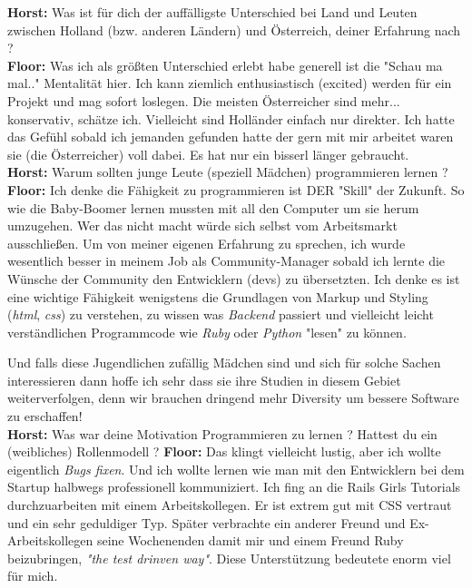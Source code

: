 \textbf{Horst:} Was ist für dich der auffälligste Unterschied bei Land und Leuten zwischen Holland (bzw. anderen Ländern) und Österreich, deiner Erfahrung nach ? \\
\textbf{Floor:} Was ich als größten Unterschied erlebt habe generell ist die "Schau ma mal.." Mentalität hier. Ich kann ziemlich enthusiastisch (excited) werden für ein Projekt und mag sofort loslegen. Die meisten Österreicher sind mehr... konservativ, schätze ich. Vielleicht sind Holländer einfach nur direkter. Ich hatte das Gefühl sobald ich jemanden gefunden hatte der gern mit mir arbeitet waren sie (die Österreicher) voll dabei. Es hat nur ein bisserl länger gebraucht. \\
\textbf{Horst:} Warum sollten junge Leute (speziell Mädchen) programmieren lernen ? \\
\textbf{Floor:} Ich denke die Fähigkeit zu programmieren ist DER "Skill" der Zukunft. So wie die Baby-Boomer lernen mussten mit all den Computer um sie herum umzugehen. Wer das nicht macht würde sich selbst vom Arbeitsmarkt ausschließen. Um von meiner eigenen Erfahrung zu sprechen, ich wurde wesentlich besser in meinem Job als Community-Manager sobald ich lernte die Wünsche der Community den Entwicklern (devs) zu übersetzten. Ich denke es ist eine  wichtige Fähigkeit wenigstens die Grundlagen von Markup und Styling (\textit{html}, \textit{css}) zu verstehen, zu wissen was \textit{Backend} passiert und vielleicht leicht verständlichen Programmcode wie \textit{Ruby} oder \textit{Python} "lesen" zu können. 

Und falls diese Jugendlichen zufällig Mädchen sind und sich für solche Sachen interessieren dann hoffe ich sehr dass sie ihre Studien in diesem Gebiet weiterverfolgen, denn wir brauchen dringend mehr Diversity um bessere Software zu erschaffen! \\
\textbf{Horst:} Was war deine Motivation Programmieren zu lernen ? Hattest du ein (weibliches) Rollenmodell ?
\textbf{Floor:} Das klingt vielleicht lustig, aber ich wollte eigentlich \textit{Bugs fixen}. Und ich wollte lernen wie man mit den Entwicklern bei dem Startup halbwegs professionell kommuniziert. Ich fing an die Rails Girls Tutorials durchzuarbeiten mit einem Arbeitskollegen. Er ist extrem gut mit CSS vertraut und ein sehr geduldiger Typ. Später verbrachte ein anderer Freund und Ex-Arbeitskollegen seine Wochenenden damit mir und einem Freund Ruby beizubringen, \textit{"the test drinven way"}. Diese Unterstützung bedeutete enorm viel für mich.


